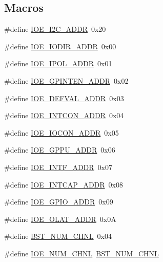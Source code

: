 \subsection*{Macros}
\begin{DoxyCompactItemize}
\item 
\#define \hyperlink{a00008_ad615a329bea187ce779cf9930ba8a6fa}{I\-O\-E\-\_\-\-I2\-C\-\_\-\-A\-D\-D\-R}~0x20
\item 
\#define \hyperlink{a00008_a36c134b088cc2e64e0a5e14e8f90fe38}{I\-O\-E\-\_\-\-I\-O\-D\-I\-R\-\_\-\-A\-D\-D\-R}~0x00
\item 
\#define \hyperlink{a00008_a04633cd2ea7fd0b332e1edf066f674c4}{I\-O\-E\-\_\-\-I\-P\-O\-L\-\_\-\-A\-D\-D\-R}~0x01
\item 
\#define \hyperlink{a00008_aa68be5a6ed28fb146600b4fd2d11fafd}{I\-O\-E\-\_\-\-G\-P\-I\-N\-T\-E\-N\-\_\-\-A\-D\-D\-R}~0x02
\item 
\#define \hyperlink{a00008_a687e15212e8d4b49c12159dce73eeeab}{I\-O\-E\-\_\-\-D\-E\-F\-V\-A\-L\-\_\-\-A\-D\-D\-R}~0x03
\item 
\#define \hyperlink{a00008_a90945d9544eebc892154f1e0443b1407}{I\-O\-E\-\_\-\-I\-N\-T\-C\-O\-N\-\_\-\-A\-D\-D\-R}~0x04
\item 
\#define \hyperlink{a00008_af44ed2bf93808aeb932ce9944a942b75}{I\-O\-E\-\_\-\-I\-O\-C\-O\-N\-\_\-\-A\-D\-D\-R}~0x05
\item 
\#define \hyperlink{a00008_a91e588d697383f94de2bf7f11d9ecb4b}{I\-O\-E\-\_\-\-G\-P\-P\-U\-\_\-\-A\-D\-D\-R}~0x06
\item 
\#define \hyperlink{a00008_a32cac2ad5af58a2562540ec8fc205dd1}{I\-O\-E\-\_\-\-I\-N\-T\-F\-\_\-\-A\-D\-D\-R}~0x07
\item 
\#define \hyperlink{a00008_ac0afd8503a8584599cc81f3d9b0a04dc}{I\-O\-E\-\_\-\-I\-N\-T\-C\-A\-P\-\_\-\-A\-D\-D\-R}~0x08
\item 
\#define \hyperlink{a00008_af2d85152c5775a221f107d6de547bca1}{I\-O\-E\-\_\-\-G\-P\-I\-O\-\_\-\-A\-D\-D\-R}~0x09
\item 
\#define \hyperlink{a00008_ab26864d7372ac11db9c1996842a3cf56}{I\-O\-E\-\_\-\-O\-L\-A\-T\-\_\-\-A\-D\-D\-R}~0x0\-A
\item 
\#define \hyperlink{a00008_ac36a77a8d07d8025000e3e748cea40dd}{B\-S\-T\-\_\-\-N\-U\-M\-\_\-\-C\-H\-N\-L}~0x04
\item 
\#define \hyperlink{a00008_a5b329f52cf0129bf56d1b16eb706dee4}{I\-O\-E\-\_\-\-N\-U\-M\-\_\-\-C\-H\-N\-L}~\hyperlink{a00008_ac36a77a8d07d8025000e3e748cea40dd}{B\-S\-T\-\_\-\-N\-U\-M\-\_\-\-C\-H\-N\-L}
\end{DoxyCompactItemize}
